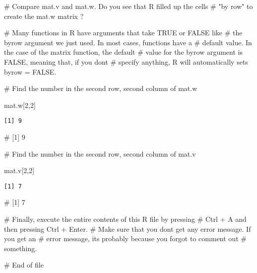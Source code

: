 \documentclass[
  letterpaper,
  DIV=11,
  numbers=noendperiod]{scrartcl}
\newenvironment{Shaded}{\begin{snugshade}}{\end{snugshade}}
\newcommand{\CommentTok}[1]{\textcolor[rgb]{0.37,0.37,0.37}{#1}}
\newcommand{\DecValTok}[1]{\textcolor[rgb]{0.68,0.00,0.00}{#1}}
\newcommand{\NormalTok}[1]{\textcolor[rgb]{0.00,0.23,0.31}{#1}}
\begin{document}
\begin{Shaded}
\begin{Highlighting}[]
\CommentTok{\# Compare mat.v and mat.w. Do you see that R filled up the cells }
\CommentTok{\# "by row" to create the mat.w matrix ? }


\CommentTok{\# Many functions in R have arguments that take TRUE or FALSE like}
\CommentTok{\# the byrow argument we just used. In most cases, functions have a }
\CommentTok{\# default value. In the case of the matrix function, the default }
\CommentTok{\# value for the byrow argument is FALSE, meaning that, if you don\textquotesingle{}t}
\CommentTok{\# specify anything, R will automatically sets byrow = FALSE. }






\CommentTok{\# Find the number in the second row, second column of mat.w}


\NormalTok{mat.w[}\DecValTok{2}\NormalTok{,}\DecValTok{2}\NormalTok{]}
\end{Highlighting}
\end{Shaded}

\begin{verbatim}
[1] 9
\end{verbatim}

\begin{Shaded}
\begin{Highlighting}[]
\CommentTok{\# [1] 9}



\CommentTok{\# Find the number in the second row, second column of mat.v}


\NormalTok{mat.v[}\DecValTok{2}\NormalTok{,}\DecValTok{2}\NormalTok{]}
\end{Highlighting}
\end{Shaded}

\begin{verbatim}
[1] 7
\end{verbatim}

\begin{Shaded}
\begin{Highlighting}[]
\CommentTok{\# [1] 7}



\CommentTok{\# Finally, execute the entire contents of this R file by pressing}
\CommentTok{\# Ctrl + A and then pressing Ctrl + Enter.}
\CommentTok{\# Make sure that you don\textquotesingle{}t get any error message. If you get an }
\CommentTok{\# error message, it\textquotesingle{}s probably because you forgot to comment out }
\CommentTok{\# something. }


\CommentTok{\# End of file}
\end{Highlighting}
\end{Shaded}
\end{document}
